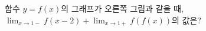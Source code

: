 \noindent\begin{minipage}[t]{0.58\linewidth}\vspace{0pt}\raggedright 함수 $y=f(x)$의 그래프가 오른쪽 그림과 같을 때, $\displaystyle\lim_{x\to 1-} f(x-2)+\lim_{x\to 1+} f(f(x))$의 값은?\end{minipage}\hfill\begin{minipage}[t]{0.4\linewidth}\vspace{0pt}\centering \resizebox{\ifdim\width>\linewidth\linewidth\else\width\fi}{!}{}\end{minipage}\par
{}
